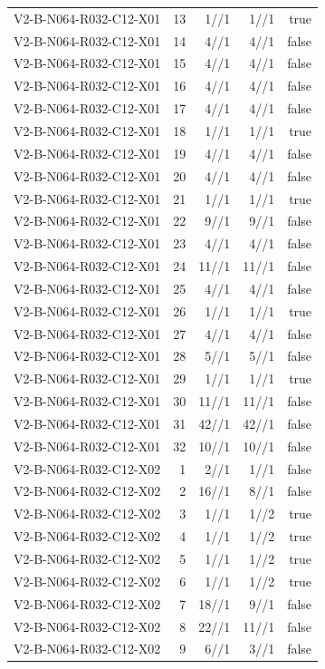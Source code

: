 {\begin{longtable}{lrrrr}
V2-B-N064-R032-C12-X01 & 13 & 1//1 & 1//1 & true \\
V2-B-N064-R032-C12-X01 & 14 & 4//1 & 4//1 & false \\
V2-B-N064-R032-C12-X01 & 15 & 4//1 & 4//1 & false \\
V2-B-N064-R032-C12-X01 & 16 & 4//1 & 4//1 & false \\
V2-B-N064-R032-C12-X01 & 17 & 4//1 & 4//1 & false \\
V2-B-N064-R032-C12-X01 & 18 & 1//1 & 1//1 & true \\
V2-B-N064-R032-C12-X01 & 19 & 4//1 & 4//1 & false \\
V2-B-N064-R032-C12-X01 & 20 & 4//1 & 4//1 & false \\
V2-B-N064-R032-C12-X01 & 21 & 1//1 & 1//1 & true \\
V2-B-N064-R032-C12-X01 & 22 & 9//1 & 9//1 & false \\
V2-B-N064-R032-C12-X01 & 23 & 4//1 & 4//1 & false \\
V2-B-N064-R032-C12-X01 & 24 & 11//1 & 11//1 & false \\
V2-B-N064-R032-C12-X01 & 25 & 4//1 & 4//1 & false \\
V2-B-N064-R032-C12-X01 & 26 & 1//1 & 1//1 & true \\
V2-B-N064-R032-C12-X01 & 27 & 4//1 & 4//1 & false \\
V2-B-N064-R032-C12-X01 & 28 & 5//1 & 5//1 & false \\
V2-B-N064-R032-C12-X01 & 29 & 1//1 & 1//1 & true \\
V2-B-N064-R032-C12-X01 & 30 & 11//1 & 11//1 & false \\
V2-B-N064-R032-C12-X01 & 31 & 42//1 & 42//1 & false \\
V2-B-N064-R032-C12-X01 & 32 & 10//1 & 10//1 & false \\
V2-B-N064-R032-C12-X02 & 1 & 2//1 & 1//1 & false \\
V2-B-N064-R032-C12-X02 & 2 & 16//1 & 8//1 & false \\
V2-B-N064-R032-C12-X02 & 3 & 1//1 & 1//2 & true \\
V2-B-N064-R032-C12-X02 & 4 & 1//1 & 1//2 & true \\
V2-B-N064-R032-C12-X02 & 5 & 1//1 & 1//2 & true \\
V2-B-N064-R032-C12-X02 & 6 & 1//1 & 1//2 & true \\
V2-B-N064-R032-C12-X02 & 7 & 18//1 & 9//1 & false \\
V2-B-N064-R032-C12-X02 & 8 & 22//1 & 11//1 & false \\
V2-B-N064-R032-C12-X02 & 9 & 6//1 & 3//1 & false \\

\end{longtable}}
